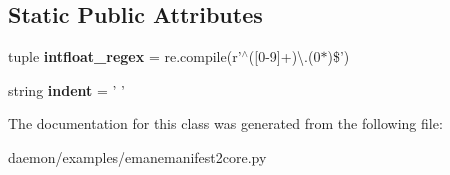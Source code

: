\subsection*{Static Public Attributes}
\begin{DoxyCompactItemize}
\item 
\hypertarget{classemanemanifest2core_1_1_emane_manifest2_model_1_1_emane_model_1_1_emane_model_parameter_a4d7376be75f78a5041ee329d02c7c3de}{tuple {\bfseries intfloat\+\_\+regex} = re.\+compile(r'$^\wedge$(\mbox{[}0-\/9\mbox{]}+)\textbackslash{}.(0$\ast$)\$')}\label{classemanemanifest2core_1_1_emane_manifest2_model_1_1_emane_model_1_1_emane_model_parameter_a4d7376be75f78a5041ee329d02c7c3de}

\item 
\hypertarget{classemanemanifest2core_1_1_emane_manifest2_model_1_1_emane_model_1_1_emane_model_parameter_a928d595b24c2cafa8b24db5bc38bd781}{string {\bfseries indent} = ' '}\label{classemanemanifest2core_1_1_emane_manifest2_model_1_1_emane_model_1_1_emane_model_parameter_a928d595b24c2cafa8b24db5bc38bd781}

\end{DoxyCompactItemize}


The documentation for this class was generated from the following file\+:\begin{DoxyCompactItemize}
\item 
daemon/examples/emanemanifest2core.\+py\end{DoxyCompactItemize}
